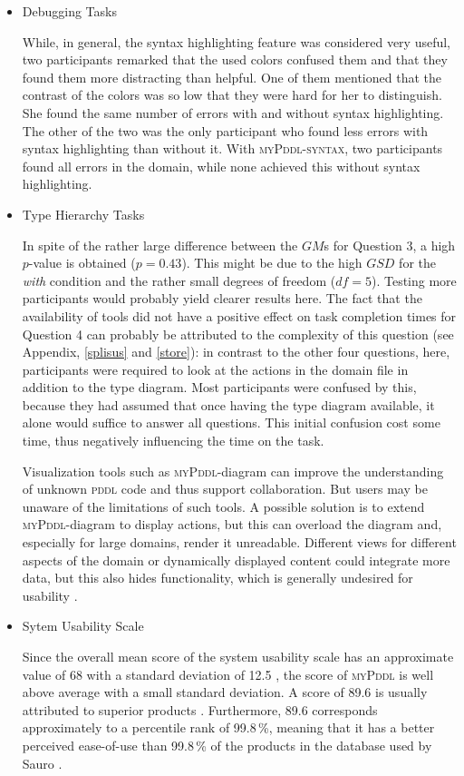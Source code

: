 \documentclass[runningheads]{llncs}
\newcommand{\mypddl}{\textsc{myPddl}\xspace}
\newcommand{\mypddlsyntax}{\textsc{myPddl-syntax}\xspace}
\newcommand{\pddl}{\textsc{pddl}\xspace}
\begin{document}
\begin{itemize}
\item Debugging Tasks

  While, in general, the syntax highlighting feature was considered
  very useful, two participants remarked that the used colors confused
  them and that they found them more distracting than helpful. One of
  them mentioned that the contrast of the colors was so low that they
  were hard for her to distinguish. She found the same number of
  errors with and without syntax highlighting. The other of the two
  was the only participant who found less errors with syntax
  highlighting than without it. With \mypddlsyntax, two participants
  found all errors in the domain, while none achieved this without
  syntax highlighting.

\item Type Hierarchy Tasks

  In spite of the rather large difference between the $GM$s for
  Question 3, a high $p$-value is obtained ($p = 0.43$). This might be
  due to the high $GSD$ for the \emph{with} condition and the rather
  small degrees of freedom ($df = 5$). Testing more participants would
  probably yield clearer results here. The fact that the availability
  of tools did not have a positive effect on task completion times for
  Question 4 can probably be attributed to the complexity of this
  question (see Appendix, \ref{splisus} and \ref{store}): in contrast
  to the other four questions, here, participants were required to
  look at the actions in the domain file in addition to the type
  diagram. Most participants were confused by this, because they had
  assumed that once having the type diagram available, it alone would
  suffice to answer all questions. This initial confusion cost some
  time, thus negatively influencing the time on the task.

  Visualization tools such as \mypddl -diagram can improve the
  understanding of unknown \pddl code and thus support
  collaboration. But users may be unaware of the limitations of such
  tools. A possible solution is to extend \mypddl -diagram to display
  actions, but this can overload the diagram and, especially for large
  domains, render it unreadable. Different views for different aspects
  of the domain or dynamically displayed content could integrate more
  data, but this also hides functionality, which is generally
  undesired for usability \cite{norman2002design}.

\item Sytem Usability Scale

Since the overall mean score of the system usability scale has an
approximate value of 68 with a standard deviation of 12.5
\cite{sauro2011practical}, the score of \mypddl is well above average
with a small standard deviation. A score of 89.6 is usually attributed
to superior products \cite{bangor2008empirical}. Furthermore, 89.6
corresponds approximately to a percentile rank of 99.8\,\%, meaning
that it has a better perceived ease-of-use than 99.8\,\% of the
products in the database used by Sauro \cite{sauro2011practical}.

\end{itemize}
\end{document}
